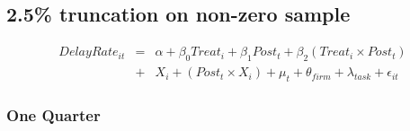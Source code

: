 \documentclass[
]{article}
\begin{document}
\hypertarget{truncation-on-non-zero-sample}{%
\subsection{2.5\% truncation on non-zero
sample}\label{truncation-on-non-zero-sample}}

\[ \begin{aligned} DelayRate_{it} &=& \alpha+\beta_0 Treat_i + \beta_1 Post_t + \beta_2 (Treat_i \times Post_t)\\
&+&  X_i + (Post_t \times X_i) + \mu_t + \theta_{firm} + \lambda_{task}+ \epsilon_{it}
\end{aligned}\]

\hypertarget{one-quarter-5}{%
\subsubsection{One Quarter}\label{one-quarter-5}}
\end{document}

